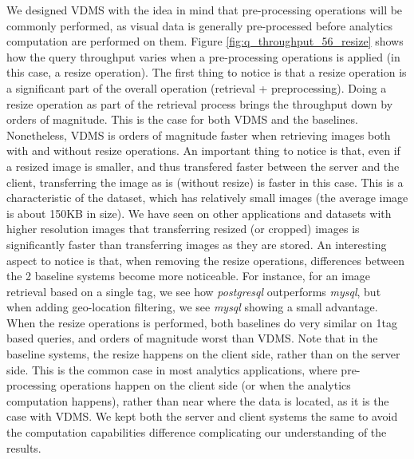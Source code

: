 We designed VDMS with the idea in mind that pre-processing operations will be
commonly performed, as visual data is generally pre-processed before analytics
computation are performed on them.
Figure \ref{fig:q_throughput_56_resize} shows how the query throughput varies
when a pre-processing operations is applied (in this case, a resize operation).
The first thing to notice is that a resize operation is a significant part of
the overall operation (retrieval + preprocessing).
Doing a resize operation as part of the retrieval process
brings the throughput down by orders of magnitude.
This is the case for both VDMS and the baselines.
Nonetheless, VDMS is orders of magnitude faster when retrieving images
both with and without resize operations.
An important thing to notice is that, even if a resized image is smaller,
and thus transfered faster between the server and the client,
transferring the image as is (without resize) is faster in this case.
This is a characteristic of the dataset, which has relatively small images
(the average image is about 150KB in size).
We have seen on other applications and datasets with higher resolution images
that transferring resized (or cropped) images is significantly faster than
transferring images as they are stored.
An interesting aspect to notice is that, when removing the resize operations,
differences between the 2 baseline systems become more noticeable.
For instance, for an image retrieval based on a single tag, we see how
\textit{postgresql} outperforms \textit{mysql}, but when adding geo-location
filtering, we see \textit{mysql} showing a small advantage.
When the resize operations is performed, both baselines do very similar
on 1tag based queries, and orders of magnitude worst than VDMS.
Note that in the baseline systems, the resize happens on the client side,
rather than on the server side.
This is the common case in most analytics applications, where pre-processing
operations happen on the client side (or when the analytics computation happens),
rather than near where the data is located, as it is the case with VDMS.
We kept both the server and client systems the same to avoid the computation
capabilities difference complicating our understanding of the results.






